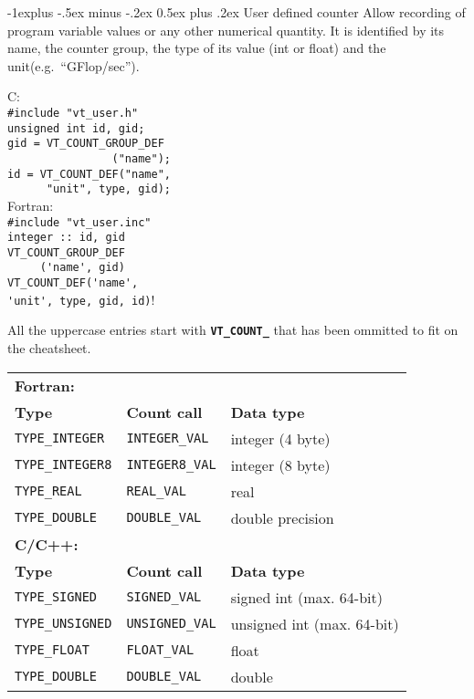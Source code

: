 \documentclass[letterpaper,10pt,landscape]{article}
\makeatletter
\renewcommand{\subsection}{\@startsection{subsection}{2}{0mm}%
                                {-1explus -.5ex minus -.2ex}%
                                {0.5ex plus .2ex}%
                                {\normalfont\normalsize\bfseries}}
\makeatother
\begin{document}
\begin{multicols}{3}
\subsection{User defined counter}
Allow recording of program variable values or any other numerical quantity.
It is identified by its name, the counter group, the type of its value (int or float) and the unit(e.g.~``GFlop/sec'').
\begin{multicols}{2}
C:\\
\verb!#include "vt_user.h"!\\
\verb!unsigned int id, gid;!\\
\verb!gid = VT_COUNT_GROUP_DEF!\\
\verb!                ("name");!\\
\verb!id = VT_COUNT_DEF("name",!\\
\verb!      "unit", type, gid);!\\

Fortran:\\
\verb!#include "vt_user.inc"!\\
\verb!integer :: id, gid!\\
\verb!VT_COUNT_GROUP_DEF!\\
\verb!     ('name', gid)!\\
\verb!VT_COUNT_DEF('name',!\\
\verb!'unit', type, gid, id)!!\\
\end{multicols}

All the uppercase entries start with \texttt{\textbf{VT\_COUNT\_}} that has been ommitted to fit on the cheatsheet.
\begin{tabular}{@{}l@{ }l@{ }l@{}}
\textbf{Fortran:} \\
\textbf{Type} & \textbf{Count call} & \textbf{Data type} \\ 
\texttt{TYPE\_INTEGER} &
	\texttt{INTEGER\_VAL} &
	integer (4 byte) \\
\texttt{TYPE\_INTEGER8} &
	\texttt{INTEGER8\_VAL} &
	integer (8 byte) \\
\texttt{TYPE\_REAL} &
	\texttt{REAL\_VAL} &
	real \\
\texttt{TYPE\_DOUBLE} &
	\texttt{DOUBLE\_VAL} &
	double precision \\

\textbf{C/C++:} \\
\textbf{Type} & \textbf{Count call} & \textbf{Data type} \\ 
\texttt{TYPE\_SIGNED} &
	\texttt{SIGNED\_VAL} &
	signed int (max. 64-bit) \\
\texttt{TYPE\_UNSIGNED} &
	\texttt{UNSIGNED\_VAL} &
	unsigned int (max. 64-bit) \\
\texttt{TYPE\_FLOAT} &
	\texttt{FLOAT\_VAL} &
	float \\
\texttt{TYPE\_DOUBLE} &
	\texttt{DOUBLE\_VAL} &
	double \\
\end{tabular}


\end{multicols}
\end{document}
